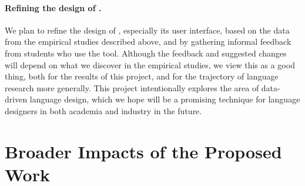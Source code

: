 \paragraph{Refining the design of \Hazel.} 
We plan to refine the design of \Hazel, especially its user interface,
based on the data from the empirical studies described above, and by
gathering informal feedback from students who use the tool.
%
Although the feedback and suggested changes will depend on what we
discover in the empirical studies, we view this as a good thing, both
for the results of this project, and for the trajectory of language
research more generally.  This project intentionally explores the area
of data-driven language design, which we hope will be a promising
technique for language designers in both academia and industry in the
future.

\vspace{-5px}
\section{Broader Impacts of the Proposed Work}
\label{sec:broaderimpacts}


